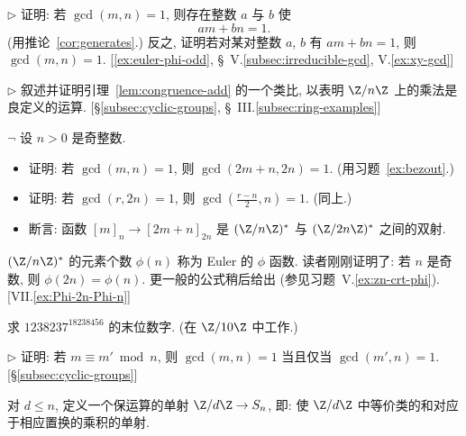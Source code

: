 \begin{prob}
\label{ex:bezout}
$\triangleright$ 证明: 若 $\gcd(m,n) = 1$, 则存在整数 $a$ 与 $b$ 使
\[
am + bn = 1.
\]
(用推论~\ref{cor:generates}.) 反之, 证明若对某对整数 $a$, $b$ 有 $am + bn = 1$, 则 $\gcd(m,n) = 1$. [\ref{ex:euler-phi-odd}, \S~V.\ref{subsec:irreducible-gcd}, V.\ref{ex:xy-gcd}]
\end{prob}

\begin{prob}
\label{ex:congruence-multiplication}
$\triangleright$ 叙述并证明引理~\ref{lem:congruence-add} 的一个类比, 以表明 $\Z/n\Z$ 上的乘法是良定义的运算. [\S\ref{subsec:cyclic-groups}, \S~III.\ref{subsec:ring-examples}]
\end{prob}

\begin{prob}
\label{ex:euler-phi-odd}
$\neg$ 设 $n > 0$ 是奇整数.
\begin{itemize}
	\item 证明: 若 $\gcd(m, n) = 1$, 则 $\gcd(2m + n, 2n) = 1$. (用习题~\ref{ex:bezout}.)
	\item 证明: 若 $\gcd(r, 2n) = 1$, 则 $\gcd(\frac{r-n}{2}, n) = 1$. (同上.)
	\item 断言: 函数 $[m]_n \to [2m+n]_{2n}$ 是 $(\Z/n\Z)^{*}$ 与 $(\Z/2n\Z)^{*}$ 之间的双射.
\end{itemize}
$(\Z/n\Z)^{*}$ 的元素个数 $\phi(n)$ 称为 Euler 的 $\phi$ 函数. 读者刚刚证明了: 若 $n$ 是奇数, 则 $\phi(2n) = \phi(n)$. 更一般的公式稍后给出 (参见习题~V.\ref{ex:zn-crt-phi}). [VII.\ref{ex:Phi-2n-Phi-n}]
\end{prob}

\begin{prob}
\label{ex:last-digit}
求 $1238237^{18238456}$ 的末位数字. (在 $\Z/10\Z$ 中工作.)
\end{prob}

\begin{prob}
\label{ex:congruence-gcd}
$\triangleright$ 证明: 若 $m \equiv m' \bmod n$, 则 $\gcd(m, n) = 1$ 当且仅当 $\gcd(m', n) = 1$. [\S\ref{subsec:cyclic-groups}]
\end{prob}

\begin{prob}
\label{ex:zd-into-sn}
对 $d \leq n$, 定义一个保运算的单射 $\Z/d\Z \to S_n$, 即: 使 $\Z/d\Z$ 中等价类的和对应于相应置换的乘积的单射.
\end{prob}

